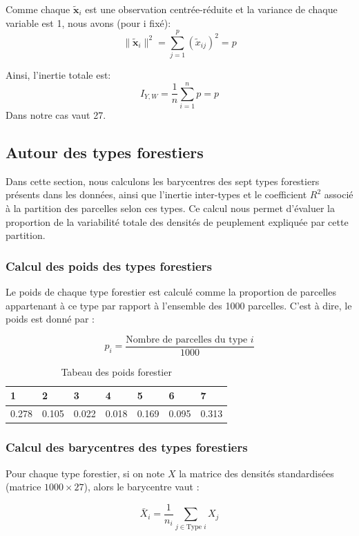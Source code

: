 \documentclass{article}
\begin{document}
Comme chaque $\mathbf{\tilde{x}}_i$ est une observation centrée-réduite et la variance de chaque variable est 1, nous avons (pour i fixé):
\[
\|\mathbf{\tilde{x}}_i\|^2 = \sum_{j=1}^p (\tilde{x}_{ij})^2 = p
\]

Ainsi, l'inertie totale est:
\[
I_{Y, W} = \frac{1}{n} \sum_{i=1}^n p = p 
\]
Dans notre cas vaut 27.

\subsection{Autour des types forestiers}

Dans cette section, nous calculons les barycentres des sept types forestiers présents dans les données, ainsi que l'inertie inter-types et le coefficient $R^2$ associé à la partition des parcelles selon ces types. Ce calcul nous permet d'évaluer la proportion de la variabilité totale des densités de peuplement expliquée par cette partition.

\subsubsection{Calcul des poids des types forestiers}
Le poids de chaque type forestier est calculé comme la proportion de parcelles appartenant à ce type par rapport à l'ensemble des 1000 parcelles. C'est à dire, le poids est donné par :

\[
p_i = \frac{\text{Nombre de parcelles du type } i}{1000}
\]

\begin{table}[H]
    \center
    \begin{tabular}{|l|l|l|l|l|l|l|}
    \hline
    1     & 2     & 3     & 4     & 5     & 6     & 7     \\ \hline
    0.278 & 0.105 & 0.022 & 0.018 & 0.169 & 0.095 & 0.313 \\ \hline
    \end{tabular}
    \caption{Tabeau des poids forestier}
    \end{table}


\subsubsection{Calcul des barycentres des types forestiers}
Pour chaque type forestier, si on note $X$ la matrice des densités standardisées (matrice $1000 \times 27$), alors le barycentre vaut :

\[
\bar{X}_i = \frac{1}{n_i} \sum_{j \in \text{Type } i} X_j
\]
\end{document}
